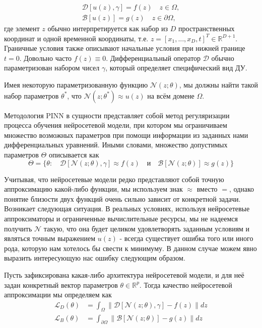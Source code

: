 \documentclass[a4paper, 12pt]{article}
\begin{document}
\begin{equation} \label{eq:pinn:problemStatement}
\begin{gathered}
    \mathcal{D}[u(z), \gamma] = f(z) \quad z \in \Omega, \\
    \mathcal{B}[u(z)] = g(z) \quad z \in \partial \Omega,
\end{gathered}
\end{equation}
где элемент $z$ обычно интерпретируется как набор из $D$ пространственных координат и одной временной координаты, т.е. $z = [x_1, ..., x_D, t]^T \in \mathbb{R}^{D + 1}$. Граничные условия также описывают начальные условия при нижней границе $t = 0$. Довольно часто $f(z) \equiv 0$. Дифференциальный оператор $\mathcal{D}$ обычно параметризован набором чисел $\gamma$, который определяет специфический вид ДУ.

Имея некоторую параметризованную функцию $\mathcal{N}(z; \theta)$, мы должны найти такой набор параметров $\theta^*$, что $\mathcal{N}(z; \theta^*) \approx u(z)$ на всём домене $\Omega$.

Методология PINN в сущности представляет собой метод регуляризации процесса обучения нейросетевой модели, при котором мы ограничиваем множество возможных параметров при помощи информации из заданных нами дифференциальных уравнений. Иными словами, множество допустимых параметров $\Theta$ описывается как
$$
\Theta = \{\theta : \quad \mathcal{D}[\mathcal{N}(z; \theta), \gamma] \approx f(z) \quad \text{и} \quad \mathcal{B}[\mathcal{N}(z; \theta)] \approx g(z)\}
$$

Учитывая, что нейросетевые модели редко представляют собой точную аппроксимацию какой-либо функции, мы используем знак $\approx$ вместо $=$, однако понятие близости двух функций очень сильно зависит от конкретной задачи. Возникает следующая ситуация. В реальных условиях, используя нейросетевые аппроксиматоры и ограниченные вычислительные ресурсы, мы не надеемся получить $\mathcal{N}$ такую, что она будет целиком удовлетворять заданным условиям и являться точным выражением $u(z)$ - всегда существует ошибка того или иного рода, которую нам хотелось бы свести к минимуму. В данном случае можем явно выразить интересующую нас ошибку следующим образом. 

Пусть зафиксирована какая-либо архитектура нейросетевой модели, и для неё задан конкретный вектор параметров $\theta \in \mathbb{R}^p$. Тогда качество нейросетевой аппроксимации мы определяем как
\begin{equation} \label{eq:pinn:losses}
    \begin{aligned}
    \mathcal{L}_D(\theta) &= \int_{\Omega} \|\mathcal{D}[\mathcal{N}(z; \theta), \gamma] - f(z)\|dz  \\
    \mathcal{L}_B(\theta) &= \int_{\partial \Omega}\|\mathcal{B}[\mathcal{N}(z; \theta)] - g(z)\|dz
    \end{aligned}
\end{equation}
\end{document}
